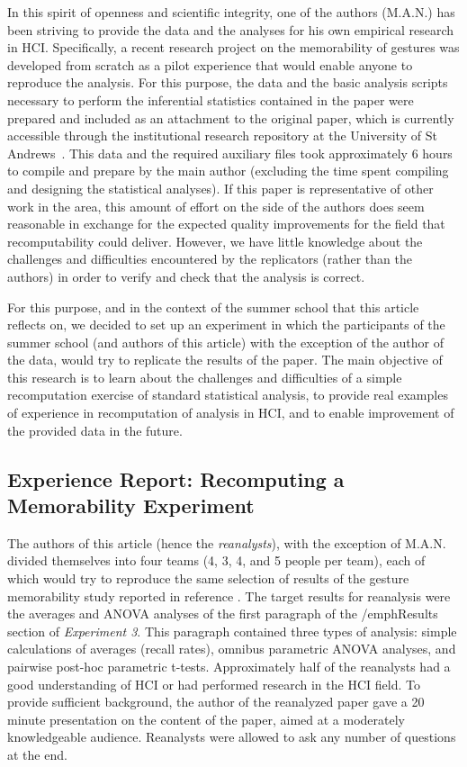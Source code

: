 In this spirit of openness and scientific integrity, one of the authors (M.A.N.) has been striving to provide the data and the analyses for his own empirical research in HCI. Specifically, a recent research project on the memorability of gestures \cite{Nacenta:memorability} was developed from scratch as a pilot experience that would enable anyone to reproduce the analysis. For this purpose, the data and the basic analysis scripts necessary to perform the inferential statistics contained in the paper were prepared and included as an attachment to the original paper, which is currently accessible through the institutional research repository at the University of St Andrews~\cite{Nacenta:memorability_data}. This data and the required auxiliary files took approximately 6 hours to compile and prepare by the main author (excluding the time spent compiling and designing the statistical analyses). If this paper is representative of other work in the area, this amount of effort on the side of the authors does seem reasonable in exchange for the expected quality improvements for the field that recomputability could deliver. However, we have little knowledge about the challenges and difficulties encountered by the replicators (rather than the authors) in order to verify and check that the analysis is correct.

For this purpose, and in the context of the summer school that this article reflects on, we decided to set up an experiment in which the participants of the summer school (and authors of this article) with the exception of the author of the data, would try to replicate the results of the paper. The main objective of this research is to learn about the challenges and difficulties of a simple recomputation exercise of standard statistical analysis, to provide real examples of experience in recomputation of analysis in HCI, and to enable improvement of the provided data in the future.

\subsection{Experience Report: Recomputing a Memorability Experiment}
The authors of this article (hence the \emph{reanalysts}), with the exception of
M.A.N. divided themselves into four teams (4, 3, 4, and 5 people per team), each of which would try to reproduce the same selection of results of the gesture memorability study reported in reference \cite{Nacenta:memorability}. The target results for reanalysis were the averages and ANOVA analyses of the first paragraph of the /emph{Results} section of \emph{Experiment 3}. This paragraph contained three types of analysis: simple calculations of averages (recall rates), omnibus parametric ANOVA analyses, and pairwise post-hoc parametric t-tests. Approximately half of the reanalysts had a good understanding of HCI or had performed research in the HCI field. To provide sufficient background, the author of the reanalyzed paper gave a 20 minute presentation on the content of the paper, aimed at a moderately knowledgeable audience. Reanalysts were allowed to ask any number of questions at the end.

